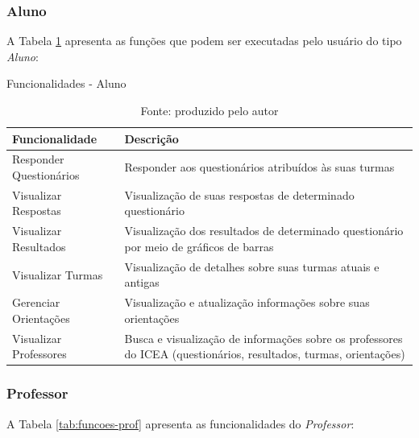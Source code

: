 \documentclass[
  12pt,       %
  openright,      %
  oneside,      %
  a4paper,      %
  english,      %
  french,        %
  spanish,     %
  brazil        %
  ]{abntex2-decsi}
\begin{document}
    \subsubsection{Aluno}

    A Tabela \ref{tab:funcoes-aluno} apresenta as funções que podem ser executadas pelo usuário do tipo \textit{Aluno}: 

    \begin{table}[h]
    \centering
    \caption{Funcionalidades - Aluno}
    \begin{tabular}{p{5cm} p{10cm}}
    \hline
    Funcionalidade & Descrição \\
    \hline
    \hline
    Responder Questionários & Responder aos questionários atribuídos às suas turmas\\
    \hline
    Visualizar Respostas & Visualização de suas respostas de determinado questionário\\
    \hline
    Visualizar Resultados & Visualização dos resultados de determinado questionário por meio de gráficos de barras\\
    \hline
    Visualizar Turmas & Visualização de detalhes sobre suas turmas atuais e antigas\\
    \hline
    Gerenciar Orientações & Visualização e atualização informações sobre suas orientações\\
    \hline
    Visualizar Professores & Busca e visualização de informações sobre os professores do ICEA (questionários, resultados, turmas, orientações)\\
    \hline
    \end{tabular}
    \caption*{Fonte: produzido pelo autor}
    \label{tab:funcoes-aluno}
    \end{table}
	
    \newpage
    
    \subsubsection{Professor}

    A Tabela \ref{tab:funcoes-prof} apresenta as funcionalidades do \textit{Professor}: 
\end{document}
